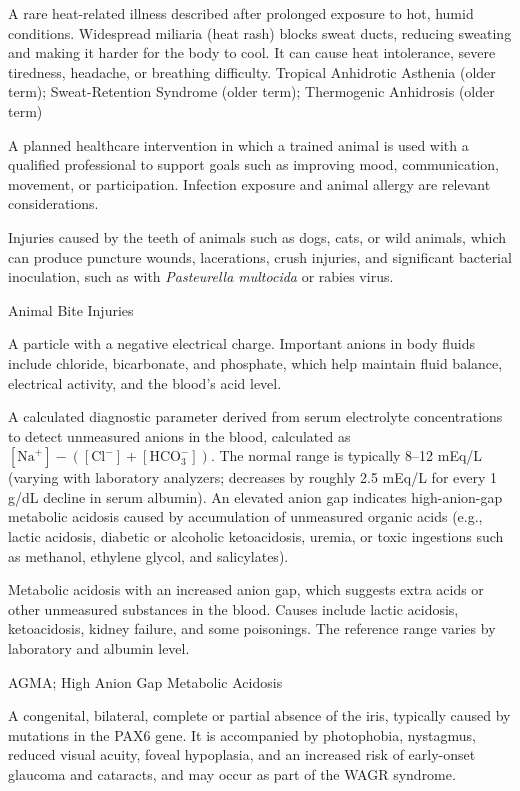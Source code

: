  A rare heat-related illness described after prolonged exposure to hot, humid conditions. Widespread miliaria (heat rash) blocks sweat ducts, reducing sweating and making it harder for the body to cool. It can cause heat intolerance, severe tiredness, headache, or breathing difficulty.
\synonyms
Tropical Anhidrotic Asthenia (older term); Sweat-Retention Syndrome (older term); Thermogenic Anhidrosis (older term)

 A planned healthcare intervention in which a trained animal is used with a qualified professional to support goals such as improving mood, communication, movement, or participation. Infection exposure and animal allergy are relevant considerations.

 Injuries caused by the teeth of animals such as dogs, cats, or wild animals, which can produce puncture wounds, lacerations, crush injuries, and significant bacterial inoculation, such as with \textit{Pasteurella multocida} or rabies virus.

\synonyms
Animal Bite Injuries

 A particle with a negative electrical charge. Important anions in body fluids include chloride, bicarbonate, and phosphate, which help maintain fluid balance, electrical activity, and the blood’s acid level.

 A calculated diagnostic parameter derived from serum electrolyte concentrations to detect unmeasured anions in the blood, calculated as $[\text{Na}^+] - ([\text{Cl}^-] + [\text{HCO}_3^-])$. The normal range is typically 8--12 mEq/L (varying with laboratory analyzers; decreases by roughly 2.5 mEq/L for every 1 g/dL decline in serum albumin). An elevated anion gap indicates high-anion-gap metabolic acidosis caused by accumulation of unmeasured organic acids (e.g., lactic acidosis, diabetic or alcoholic ketoacidosis, uremia, or toxic ingestions such as methanol, ethylene glycol, and salicylates).

 Metabolic acidosis with an increased anion gap, which suggests extra acids or other unmeasured substances in the blood. Causes include lactic acidosis, ketoacidosis, kidney failure, and some poisonings. The reference range varies by laboratory and albumin level.

\synonyms
AGMA; High Anion Gap Metabolic Acidosis

 A congenital, bilateral, complete or partial absence of the iris, typically caused by mutations in the PAX6 gene. It is accompanied by photophobia, nystagmus, reduced visual acuity, foveal hypoplasia, and an increased risk of early-onset glaucoma and cataracts, and may occur as part of the WAGR syndrome.

